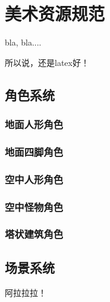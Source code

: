 ﻿\chapter{美术资源规范}

bla, bla....

所以说，还是latex好！

\section{角色系统}

\subsection{地面人形角色}

\subsection{地面四脚角色}

\subsection{空中人形角色}

\subsection{空中怪物角色}

\subsection{塔状建筑角色}

\section{场景系统}

阿拉拉拉！


